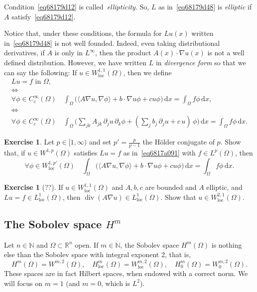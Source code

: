 \documentclass[a4paper,9pt]{amsart}
\newcommand{\N}{\mathbb{N}}	%
\newcommand{\R}{\mathbb{R}}	%
\newcommand{\did}{\,\mathrm{d}}	%
\newcommand{\de}{\partial}		%
\renewcommand{\div}{\operatorname{div}}	%
\newcommand{\IFF}{\Leftrightarrow}	%
\newcommand{\loc}{\mathrm{loc}}
\newcommand{\grad}{\nabla}
\theoremstyle{plain}
\theoremstyle{definition}
\newtheorem{exercise}[proposition]{Exercise}%
\theoremstyle{remark}
\begin{document}
Condition~\eqref{eq68179d12} is called~\emph{ellipticity}.
So, $L$ as in~\eqref{eq68179d48} is \emph{elliptic} if $A$ satisfy~\eqref{eq68179d12}.

Notice that, under these conditions, the formula for $Lu(x)$ written in~\eqref{eq68179d48} is not well founded.
Indeed, even taking distributional derivatives, if $A$ is only in $L^\infty$, then the product $A(x)\cdot\grad u(x)$ is not a well defined distribution.
However, we have written $L$ in \emph{divergence form} so that we can say the following:
If $u\in W^{1,1}_\loc(\Omega)$, then we define
\begin{equation}\label{eq6817a091}
\begin{gathered}
	Lu = f \text{ in }\Omega , \\
	\IFF\quad \\ 
	\forall\phi\in C^\infty_c(\Omega) 
	\quad\int_\Omega \bigg(\langle A\grad u,\grad\phi \rangle + b\cdot\grad u \phi + cu \phi \bigg) \did x = \int_\Omega f \phi \did x , \\
	\IFF\quad \\ 
	\forall\phi\in C^\infty_c(\Omega) 
	\quad\int_\Omega \bigg(\sum_{jk} A_{jk}\,\de_j u\,\de_k\phi + (\sum_j b_j\,\de_j u  + c\,u) \,\phi \bigg) \did x = \int_\Omega f \phi \did x .
\end{gathered}
\end{equation}

\begin{exercise}
	Let $p\in [1,\infty)$ and set $p' = \frac{p}{p-1}$ the Hölder conjugate of $p$.
	Show that, if $u\in W^{1,p}(\Omega)$ satisfies $Lu=f$ as in~\eqref{eq6817a091} 
	with $f\in L^p(\Omega)$, then 
	\begin{equation}
		\forall\phi\in W^{1,p'}_\loc(\Omega) 
		\quad\int_\Omega \bigg(\langle A\grad u,\grad\phi \rangle + b\cdot\grad u \phi + cu \phi \bigg) \did x = \int_\Omega f \phi \did x .
	\end{equation}
\end{exercise}

\begin{exercise}[??]
	If $u\in W^{1,1}_\loc(\Omega)$ and $A,b,c$ are bounded and $A$ elliptic, and $Lu=f\in L^1_\loc(\Omega)$, then $\div(A\grad u) \in L^1_\loc(\Omega)$.
	Show that $u\in W^{2,1}_\loc(\Omega)$.
\end{exercise}

\subsection{The Sobolev space $H^m$}\label{subs6817a613}
Let $n\in\N$ and $\Omega\subset\R^n$ open.
If $m\in\N$, the Sobolev space $H^m(\Omega)$ is nothing else than the Sobolev space with integral exponent 2, that is,
\begin{equation}
	H^m(\Omega) = W^{m,2}(\Omega),
	\quad
	H^m_\loc(\Omega) = W^{m,2}_\loc(\Omega),
	\quad
	H^m_0(\Omega) = W^{m,2}_0(\Omega).
\end{equation}
These spaces are in fact Hilbert spaces, when endowed with a correct norm.
We will focus on $m=1$ (and $m=0$, which is $L^2$).
\end{document}
